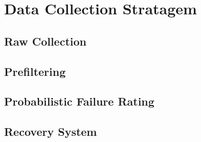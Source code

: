 \chapter{Data Collection Stratagem}
\section{Raw Collection}
\section{Prefiltering}
\section{Probabilistic Failure Rating}
\section{Recovery System}